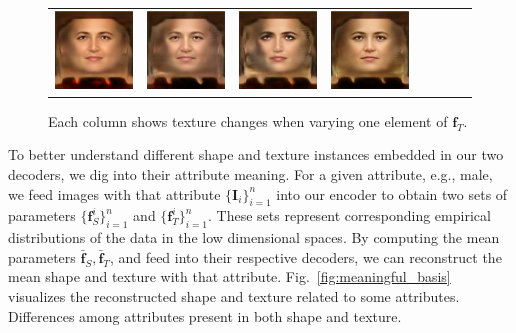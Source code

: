 \begin{figure}[t!]
\begin{center}
{\begin{tabular}{ @{}c@{}c@{}c@{}c@{}c@{}c@{}c@{}c@{}}
\\
\includegraphics[width=\VaryingShapeFigWid]{img/Basis/pred_tex_105_neg.jpg} &
\includegraphics[width=\VaryingShapeFigWid]{img/Basis/pred_tex_66_neg.jpg} &
\includegraphics[width=\VaryingShapeFigWid]{img/Basis/pred_tex_34_neg.jpg} &
\includegraphics[width=\VaryingShapeFigWid]{img/Basis/pred_tex_134_neg.jpg} &
\end{tabular}
}
\vspace{-2mm}
\caption{\small Each column shows texture changes when varying one element of $\mathbf{f}_T$.}
\label{fig:varying_tex}\figvspace \vspace{-2mm}
\end{center}
\end{figure}



To better understand different shape and texture instances embedded in our two decoders, we dig into their attribute meaning.
For a given attribute, e.g., male, we feed images with that attribute $\{\mathbf{I}_i\}_{i=1}^n$ into our encoder to obtain two sets of parameters $\{\mathbf{f}_S^{i}\}_{i=1}^n$ and $\{\mathbf{f}_T^{i}\}_{i=1}^n$. 
These sets represent corresponding empirical distributions of the data in the low dimensional spaces. 
By computing the mean parameters $\mathbf{\bar{f}}_S, \mathbf{\bar{f}}_T$, and feed into their respective decoders, we can reconstruct the mean shape and texture with that attribute. Fig.~\ref{fig:meaningful_basis} visualizes the reconstructed shape and texture related to some attributes. 
Differences among attributes present in both shape and texture.

